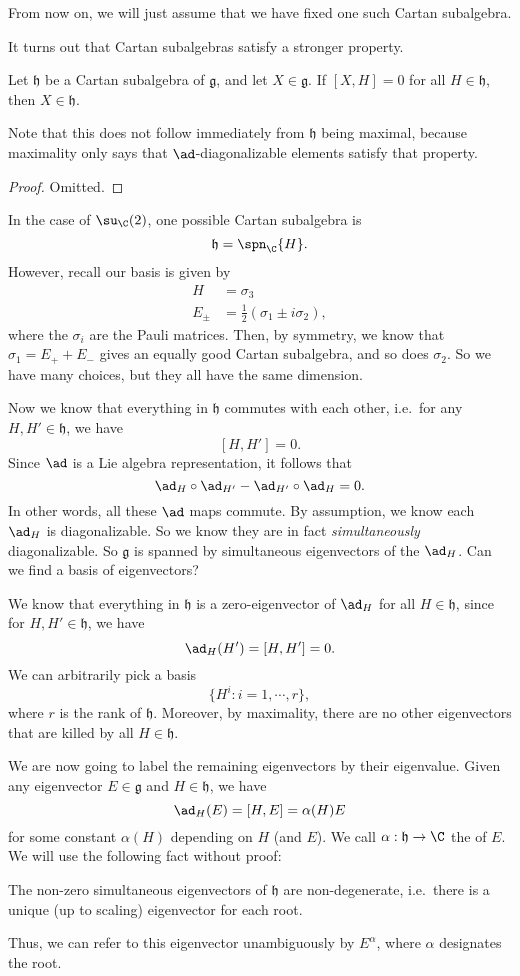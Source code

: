 \documentclass[a4paper]{article}
\begin{document}
From now on, we will just assume that we have fixed one such Cartan subalgebra.

It turns out that Cartan subalgebras satisfy a stronger property.
\begin{prop}
  Let $\mathfrak{h}$ be a Cartan subalgebra of $\mathfrak{g}$, and let $X \in \mathfrak{g}$. If $[X, H] = 0$ for all $H \in \mathfrak{h}$, then $X \in \mathfrak{h}$.
\end{prop}
Note that this does not follow immediately from $\mathfrak{h}$ being maximal, because maximality only says that $\ad$-diagonalizable elements satisfy that property.

\begin{proof}
  Omitted. %
\end{proof}


\begin{eg}
  In the case of $\su_\C(2)$, one possible Cartan subalgebra is
  \[
    \mathfrak{h} = \spn_\C \{H\}.
  \]
  However, recall our basis is given by
  \begin{align*}
    H &= \sigma_3\\
    E_{\pm} &= \frac{1}{2}(\sigma_1 \pm i \sigma_2),
  \end{align*}
  where the $\sigma_i$ are the Pauli matrices. Then, by symmetry, we know that $\sigma_1 = E_+ + E_-$ gives an equally good Cartan subalgebra, and so does $\sigma_2$. So we have many choices, but they all have the same dimension.
\end{eg}

Now we know that everything in $\mathfrak{h}$ commutes with each other, i.e.\ for any $H, H' \in \mathfrak{h}$, we have
\[
  [H, H'] = 0.
\]
Since $\ad$ is a Lie algebra representation, it follows that
\[
  \ad_{H} \circ \ad_{H'} - \ad_{H'} \circ \ad_H = 0.
\]
In other words, all these $\ad$ maps commute. By assumption, we know each $\ad_H$ is diagonalizable. So we know they are in fact \emph{simultaneously} diagonalizable. So $\mathfrak{g}$ is spanned by simultaneous eigenvectors of the $\ad_H$. Can we find a basis of eigenvectors?

We know that everything in $\mathfrak{h}$ is a zero-eigenvector of $\ad_H$ for all $H \in \mathfrak{h}$, since for $H, H' \in\mathfrak{h}$, we have
\[
  \ad_{H}(H') = [H, H'] = 0.
\]
We can arbitrarily pick a basis
\[
  \{H^i: i = 1, \cdots, r\},
\]
where $r$ is the rank of $\mathfrak{h}$. Moreover, by maximality, there are no other eigenvectors that are killed by all $H \in \mathfrak{h}$.

We are now going to label the remaining eigenvectors by their eigenvalue. Given any eigenvector $E \in \mathfrak{g}$ and $H \in \mathfrak{h}$, we have
\[
  \ad_H(E) = [H, E] = \alpha(H) E
\]
for some constant $\alpha(H)$ depending on $H$ (and $E$). We call $\alpha: \mathfrak{h} \to \C$ the  of $E$. We will use the following fact without proof:
\begin{fact}
  The non-zero simultaneous eigenvectors of $\mathfrak{h}$ are non-degenerate, i.e.\ there is a unique (up to scaling) eigenvector for each root.
\end{fact}
Thus, we can refer to this eigenvector unambiguously by $E^\alpha$, where $\alpha$ designates the root.
\end{document}

